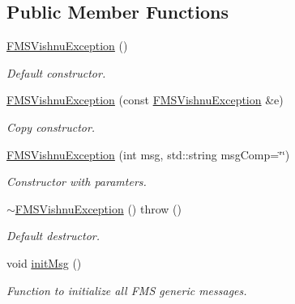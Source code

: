 \subsection*{Public Member Functions}
\begin{DoxyCompactItemize}
\item 
\hypertarget{classFMSVishnuException_a162581d71ff0e7811dc0f875464bb468}{
\hyperlink{classFMSVishnuException_a162581d71ff0e7811dc0f875464bb468}{FMSVishnuException} ()}
\label{classFMSVishnuException_a162581d71ff0e7811dc0f875464bb468}

\begin{DoxyCompactList}\small\item\em Default constructor. \item\end{DoxyCompactList}\item 
\hyperlink{classFMSVishnuException_a782cb990ff52a2448b0a5eb4682cb01f}{FMSVishnuException} (const \hyperlink{classFMSVishnuException}{FMSVishnuException} \&e)
\begin{DoxyCompactList}\small\item\em Copy constructor. \item\end{DoxyCompactList}\item 
\hyperlink{classFMSVishnuException_a9207086c3e0797b1eadc753a2bd0a0a7}{FMSVishnuException} (int msg, std::string msgComp=\char`\"{}\char`\"{})
\begin{DoxyCompactList}\small\item\em Constructor with paramters. \item\end{DoxyCompactList}\item 
\hypertarget{classFMSVishnuException_a11715b03de35ad46d35dac1b8278e1ca}{
\hyperlink{classFMSVishnuException_a11715b03de35ad46d35dac1b8278e1ca}{$\sim$FMSVishnuException} ()  throw ()}
\label{classFMSVishnuException_a11715b03de35ad46d35dac1b8278e1ca}

\begin{DoxyCompactList}\small\item\em Default destructor. \item\end{DoxyCompactList}\item 
\hypertarget{classFMSVishnuException_a0ad0448a7da7f04c842b480a4822bea3}{
void \hyperlink{classFMSVishnuException_a0ad0448a7da7f04c842b480a4822bea3}{initMsg} ()}
\label{classFMSVishnuException_a0ad0448a7da7f04c842b480a4822bea3}

\begin{DoxyCompactList}\small\item\em Function to initialize all FMS generic messages. \item\end{DoxyCompactList}\end{DoxyCompactItemize}


